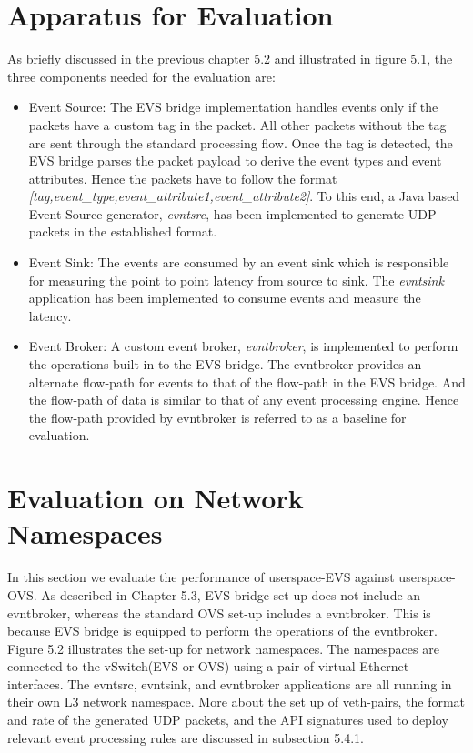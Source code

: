 \section{Apparatus for Evaluation}
As briefly discussed in the previous chapter 5.2 and illustrated in figure 5.1, the three components needed for the evaluation are:
\begin{itemize}
	\item Event Source: The EVS bridge implementation handles events only if the packets have a custom tag in the packet. All other packets without the tag are sent through the standard processing flow. Once the tag is detected, the EVS bridge parses the packet payload to derive the event types and event attributes. Hence the packets have to follow the  format \textit{[tag,event_type,event_attribute1,event_attribute2]}. To this end, a Java based Event Source generator, \textit{evntsrc}, has been implemented to generate UDP packets in the established format.
		
	\item Event Sink: The events are consumed by an event sink which is responsible for measuring the point to point latency from source to sink. The \textit{evntsink} application has been implemented to consume events and measure the latency.
	
	\item Event Broker: A custom event broker, \textit{evntbroker}, is implemented to perform the operations built-in to the EVS bridge. The evntbroker provides an alternate flow-path for events to that of the flow-path in the EVS bridge. And the flow-path of data is similar to that of any event processing engine. Hence the flow-path provided by evntbroker is referred to as a baseline for evaluation.
\end{itemize}

\section{Evaluation on Network Namespaces}
In this section we evaluate the performance of userspace-EVS against userspace-OVS. As described in Chapter 5.3, EVS bridge set-up does not include an evntbroker, whereas the standard OVS set-up includes a evntbroker. This is because EVS bridge is equipped to perform the operations of the evntbroker. Figure 5.2 illustrates the set-up for network namespaces. The namespaces are connected to the vSwitch(EVS or OVS) using a pair of virtual Ethernet interfaces. The evntsrc, evntsink, and evntbroker applications are all running in their own L3 network namespace. More about the set up of veth-pairs, the format and rate of the generated UDP packets, and the API signatures used to deploy relevant event processing rules are discussed in subsection 5.4.1.

